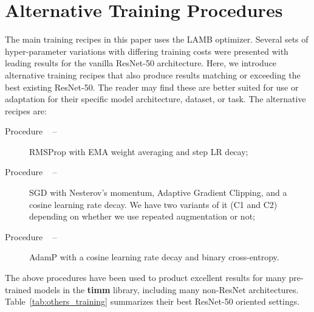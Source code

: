\section{Alternative Training Procedures}
\label{sec:alternative}

The main training recipes in this paper uses the LAMB optimizer. Several sets of hyper-parameter variations with differing training costs were presented with leading results for the vanilla ResNet-50 architecture. Here, we introduce alternative training recipes that also produce results matching or exceeding the best existing ResNet-50. The reader may find these are better suited for use or adaptation for their specific model architecture, dataset, or task. The alternative recipes are: 
\begin{description}
    \item [Procedure \Bp~ --] RMSProp with EMA weight averaging and step LR decay;
    \item [Procedure \Cp~ --] SGD with Nesterov’s momentum, Adaptive Gradient Clipping, and a cosine learning rate decay. We have two variants of it (C1 and C2) depending on whether we use repeated augmentation or not; 
    \item [Procedure \Dp~ --] AdamP with a cosine learning rate decay and binary cross-entropy. 
\end{description}

The above procedures have been used to product excellent results for many pre-trained models in the \textbf{timm} library, including many non-ResNet architectures. Table~\ref{tab:others_training} summarizes their best ResNet-50 oriented settings. 


